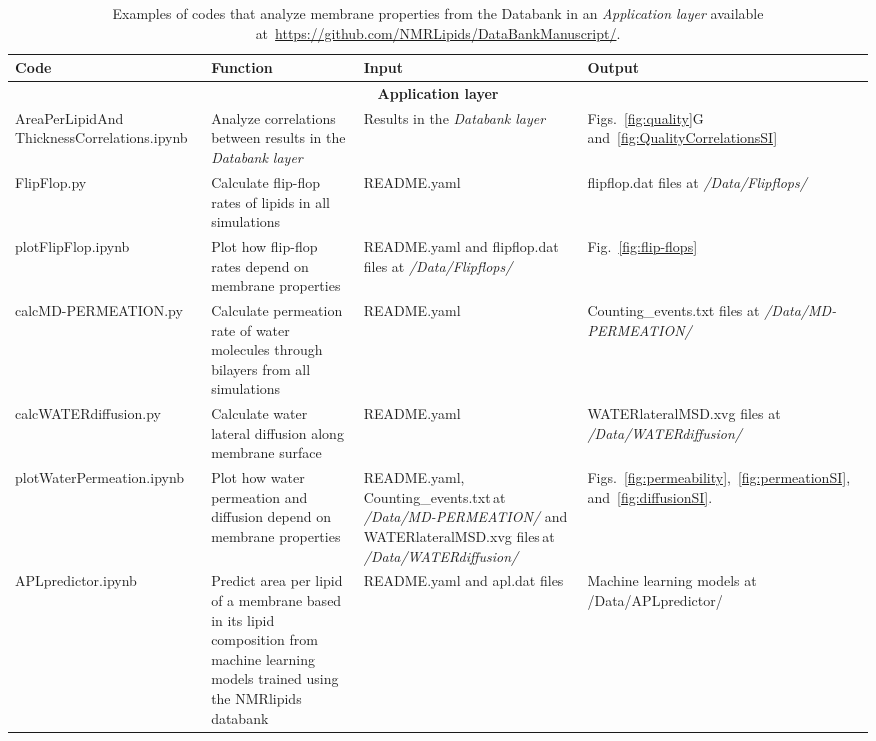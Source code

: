 \documentclass[fleqn,10pt]{wlscirepSI}
\begin{document}
\begin{table}[!h]
    \centering
    \begin{tabular}{p{3.5cm}  p{4.5cm}  p{3.0cm}  p{4.0cm}}
        Code & Function & Input & Output \\
        \hline
        \multicolumn{4}{c}{ {\bf Application layer}}\\
        \hline
        AreaPerLipidAnd ThicknessCorrelations.ipynb  & Analyze correlations between results in the {\it Databank layer}  & Results in the {\it Databank layer} & Figs.~\ref{fig:quality}G and~\ref{fig:QualityCorrelationsSI} \\
        FlipFlop.py & Calculate flip-flop rates of lipids in all simulations & README.yaml & flipflop.dat files at {\it /Data/Flipflops/} \\
        plotFlipFlop.ipynb & Plot how flip-flop rates depend on membrane properties & README.yaml and flipflop.dat files at {\it /Data/Flipflops/} & Fig.~\ref{fig:flip-flops} \\
        calcMD-PERMEATION.py  & Calculate permeation rate of water molecules through bilayers from all simulations & README.yaml & Counting\_events.txt files at {\it /Data/MD-PERMEATION/} \\
        calcWATERdiffusion.py & Calculate water lateral diffusion along membrane surface & README.yaml & WATERlateralMSD.xvg files at {\it /Data/WATERdiffusion/} \\
        plotWaterPermeation.ipynb & Plot how water permeation and diffusion depend on membrane properties & README.yaml, Counting\_events.txt\,at {\it /Data/MD-PERMEATION/} and\,WATERlateralMSD.xvg files\,at {\it /Data/WATERdiffusion/} & Figs.~\ref{fig:permeability},~\ref{fig:permeationSI}, and~\ref{fig:diffusionSI}. \\
        APLpredictor.ipynb & Predict area per lipid of a membrane based in its lipid composition from machine learning models trained using the NMRlipids databank & README.yaml and apl.dat files & Machine learning models at /Data/APLpredictor/ \\ 
    \end{tabular}
    \caption{Examples of codes that analyze membrane properties from the Databank in an {\it Application layer} available at~\url{https://github.com/NMRLipids/DataBankManuscript/}.}
    \label{tab:codesApplication}
\end{table}
\end{document}
